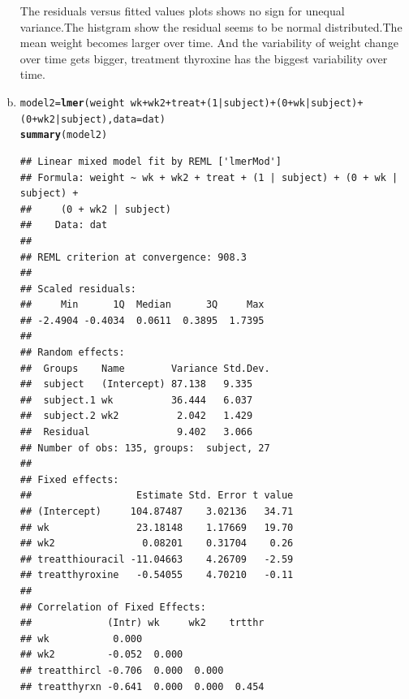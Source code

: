 \documentclass{article}\usepackage[]{graphicx}\usepackage[]{color}
\makeatletter
\newcommand{\hlnum}[1]{\textcolor[rgb]{0.686,0.059,0.569}{#1}}%
\newcommand{\hlopt}[1]{\textcolor[rgb]{0,0,0}{#1}}%
\newcommand{\hlstd}[1]{\textcolor[rgb]{0.345,0.345,0.345}{#1}}%
\newcommand{\hlkwb}[1]{\textcolor[rgb]{0.69,0.353,0.396}{#1}}%
\newcommand{\hlkwc}[1]{\textcolor[rgb]{0.333,0.667,0.333}{#1}}%
\newcommand{\hlkwd}[1]{\textcolor[rgb]{0.737,0.353,0.396}{\textbf{#1}}}%
\newenvironment{kframe}{%
 \def\at@end@of@kframe{}%
 \ifinner\ifhmode%
  \def\at@end@of@kframe{\end{minipage}}%
  \begin{minipage}{\columnwidth}%
 \fi\fi%
 \def\FrameCommand##1{\hskip\@totalleftmargin \hskip-\fboxsep
 \colorbox{shadecolor}{##1}\hskip-\fboxsep
     \hskip-\linewidth \hskip-\@totalleftmargin \hskip\columnwidth}%
 \MakeFramed {\advance\hsize-\width
   \@totalleftmargin\z@ \linewidth\hsize
   \@setminipage}}%
 {\par\unskip\endMakeFramed%
 \at@end@of@kframe}
\newenvironment{knitrout}{}{} %
\makeatother
\begin{document}
\begin{enumerate}[(a)]
\begin{knitrout}
\end{knitrout}

\qquad The residuals versus fitted values plots shows no sign for unequal variance.The histgram show the residual seems to be normal distributed.The mean weight becomes larger over time. And the variability of weight change over time gets bigger, treatment thyroxine has the biggest variability over time.

\item

\begin{knitrout}
\color{fgcolor}\begin{kframe}
\begin{alltt}
  \hlstd{model2} \hlkwb{=} \hlkwd{lmer}\hlstd{(weight} \hlopt{~} \hlstd{wk} \hlopt{+} \hlstd{wk2} \hlopt{+} \hlstd{treat}  \hlopt{+} \hlstd{(}\hlnum{1}\hlopt{|}\hlstd{subject)}\hlopt{+} \hlstd{(}\hlnum{0} \hlopt{+} \hlstd{wk}\hlopt{|}\hlstd{subject)}\hlopt{+} \hlstd{(}\hlnum{0} \hlopt{+} \hlstd{wk2}\hlopt{|}\hlstd{subject),} \hlkwc{data} \hlstd{= dat )}
  \hlkwd{summary}\hlstd{(model2)}
\end{alltt}
\begin{verbatim}
## Linear mixed model fit by REML ['lmerMod']
## Formula: weight ~ wk + wk2 + treat + (1 | subject) + (0 + wk | subject) +  
##     (0 + wk2 | subject)
##    Data: dat
## 
## REML criterion at convergence: 908.3
## 
## Scaled residuals: 
##     Min      1Q  Median      3Q     Max 
## -2.4904 -0.4034  0.0611  0.3895  1.7395 
## 
## Random effects:
##  Groups    Name        Variance Std.Dev.
##  subject   (Intercept) 87.138   9.335   
##  subject.1 wk          36.444   6.037   
##  subject.2 wk2          2.042   1.429   
##  Residual               9.402   3.066   
## Number of obs: 135, groups:  subject, 27
## 
## Fixed effects:
##                  Estimate Std. Error t value
## (Intercept)     104.87487    3.02136   34.71
## wk               23.18148    1.17669   19.70
## wk2               0.08201    0.31704    0.26
## treatthiouracil -11.04663    4.26709   -2.59
## treatthyroxine   -0.54055    4.70210   -0.11
## 
## Correlation of Fixed Effects:
##             (Intr) wk     wk2    trtthr
## wk           0.000                     
## wk2         -0.052  0.000              
## treatthircl -0.706  0.000  0.000       
## treatthyrxn -0.641  0.000  0.000  0.454
\end{verbatim}
\end{kframe}
\end{knitrout}


\end{enumerate}
\end{document}
